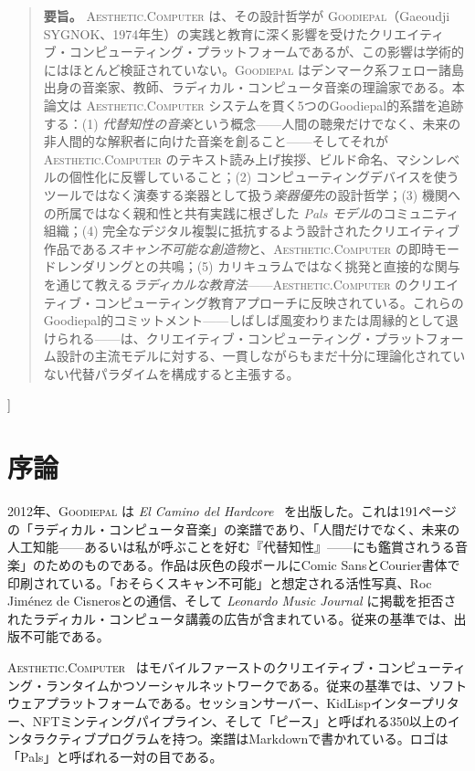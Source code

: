 \documentclass[10pt,letterpaper,twocolumn]{article}
\newcommand{\ac}{\textsc{Aesthetic.Computer}}
\newcommand{\gp}{\textsc{Goodiepal}}
\begin{document}
{\begin{quote}
\small\noindent\textbf{要旨。}
\ac{} は、その設計哲学が \gp{}（Gaeoudji SYGNOK、1974年生）の実践と教育に深く影響を受けたクリエイティブ・コンピューティング・プラットフォームであるが、この影響は学術的にはほとんど検証されていない。\gp{} はデンマーク系フェロー諸島出身の音楽家、教師、ラディカル・コンピュータ音楽の理論家である。本論文は \ac{} システムを貫く5つのGoodiepal的系譜を追跡する：(1) \emph{代替知性の音楽}という概念——人間の聴衆だけでなく、未来の非人間的な解釈者に向けた音楽を創ること——そしてそれが \ac{} のテキスト読み上げ挨拶、ビルド命名、マシンレベルの個性化に反響していること；(2) コンピューティングデバイスを使うツールではなく演奏する楽器として扱う\emph{楽器優先}の設計哲学；(3) 機関への所属ではなく親和性と共有実践に根ざした \emph{Pals モデル}のコミュニティ組織；(4) 完全なデジタル複製に抵抗するよう設計されたクリエイティブ作品である\emph{スキャン不可能な創造物}と、\ac{} の即時モードレンダリングとの共鳴；(5) カリキュラムではなく挑発と直接的な関与を通じて教える\emph{ラディカルな教育法}——\ac{} のクリエイティブ・コンピューティング教育アプローチに反映されている。これらのGoodiepal的コミットメント——しばしば風変わりまたは周縁的として退けられる——は、クリエイティブ・コンピューティング・プラットフォーム設計の主流モデルに対する、一貫しながらもまだ十分に理論化されていない代替パラダイムを構成すると主張する。
\end{quote}
\vspace{0.5em}
}]

\section{序論}

2012年、\gp{} は \emph{El Camino del Hardcore}~\citep{goodiepal2012elcamino} を出版した。これは191ページの「ラディカル・コンピュータ音楽」の楽譜であり、「人間だけでなく、未来の人工知能——あるいは私が呼ぶことを好む『代替知性』——にも鑑賞されうる音楽」のためのものである。作品は灰色の段ボールにComic SansとCourier書体で印刷されている。「おそらくスキャン不可能」と想定される活性写真、Roc Jim\'enez de Cisnerosとの通信、そして \emph{Leonardo Music Journal} に掲載を拒否されたラディカル・コンピュータ講義の広告が含まれている。従来の基準では、出版不可能である。

\ac{}~\citep{scudder2026ac} はモバイルファーストのクリエイティブ・コンピューティング・ランタイムかつソーシャルネットワークである。従来の基準では、ソフトウェアプラットフォームである。セッションサーバー、KidLispインタープリター、NFTミンティングパイプライン、そして「ピース」と呼ばれる350以上のインタラクティブプログラムを持つ。楽譜はMarkdownで書かれている。ロゴは「Pals」と呼ばれる一対の目である。
\end{document}
